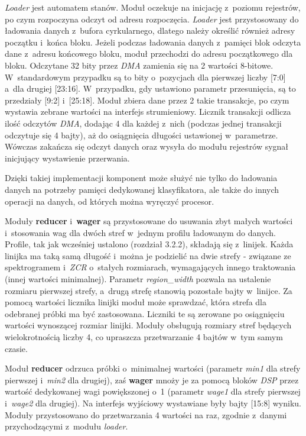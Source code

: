\textit{Loader} jest automatem stanów. Moduł oczekuje na inicjację z~poziomu rejestrów, po czym rozpoczyna odczyt od adresu rozpoczęcia. \textit{Loader} jest przystosowany do ładowania danych z~bufora cyrkularnego, dlatego należy określić również adresy początku i~końca bloku. Jeżeli podczas ładowania danych z~pamięci blok odczyta dane z~adresu końcowego bloku, moduł przechodzi do adresu początkowego dla bloku. Odczytane 32 bity przez \textit{DMA} zamienia się na 2 wartości 8-bitowe. W~standardowym przypadku są to bity o~pozycjach dla pierwszej liczby [7:0] a~dla drugiej [23:16]. W~przypadku, gdy ustawiono parametr przesunięcia, są to przedziały [9:2] i~[25:18]. Moduł zbiera dane przez 2 takie transakcje, po czym wystawia zebrane wartości na interfejs strumieniowy. Licznik transakcji odlicza ilość odczytów \textit{DMA}, dodając 4 dla każdej z~nich (podczas jednej transakcji odczytuje się 4 bajty), aż do osiągnięcia długości ustawionej w~parametrze. Wówczas zakańcza się odczyt danych oraz wysyła do modułu rejestrów sygnał inicjujący wystawienie przerwania.

Dzięki takiej implementacji komponent może służyć nie tylko do ładowania danych na potrzeby pamięci dedykowanej klasyfikatora, ale także do innych operacji na danych, od których można wyręczyć procesor.

Moduły \textbf{reducer} i~\textbf{wager} są przystosowane do usuwania zbyt małych wartości i~stosowania wag dla dwóch stref w~jednym profilu ładowanym do danych. Profile, tak jak wcześniej ustalono (rozdział 3.2.2), składają się z~linijek. Każda linijka ma taką samą długość i~można je podzielić na dwie strefy - związane ze spektrogramem i~\textit{ZCR} o~stałych rozmiarach, wymagających innego traktowania (innej wartości minimalnej). Parametr \textit{region\_width} pozwala na ustalenie rozmiaru pierwszej strefy, a~drugą strefę stanowią pozostałe bajty w~linijce. Za pomocą wartości licznika linijki moduł może sprawdzać, która strefa dla odebranej próbki ma być zastosowana. Liczniki te są zerowane po osiągnięciu wartości wynoszącej rozmiar linijki. Moduły obsługują rozmiary stref będących wielokrotnością liczby 4, co upraszcza przetwarzanie 4 bajtów w~tym samym czasie.

Moduł \textbf{reducer} odrzuca próbki o~minimalnej wartości (parametr \textit{min1} dla strefy pierwszej i~\textit{min2} dla drugiej), zaś \textbf{wager} mnoży je za pomocą bloków \textit{DSP} przez wartość dedykowanej wagi powiększonej o~1 (parametr \textit{wage1} dla strefy pierwszej i~\textit{wage2} dla drugiej). Na interfejs wyjściowy wystawiane były bajty [15:8] wyniku. Moduły przystosowano do przetwarzania 4 wartości na raz, zgodnie z~danymi przychodzącymi z~modułu \textit{loader}.

